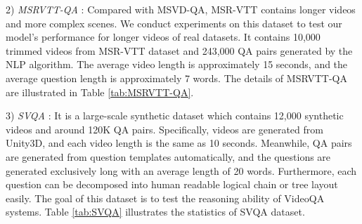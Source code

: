 \documentclass[journal]{IEEEtran}
\begin{document}
2) \textit{MSRVTT-QA} \cite{xu2016msr}: Compared with MSVD-QA, MSR-VTT contains longer videos and more complex scenes. We conduct experiments on this dataset to test our model’s performance for longer videos of real datasets. It contains 10,000 trimmed videos from MSR-VTT dataset \cite{xu2016msr} and 243,000 QA pairs generated by the NLP algorithm. The average video length is approximately 15 seconds, and the average question length is approximately 7 words. The details of MSRVTT-QA are illustrated in Table \ref{tab:MSRVTT-QA}.

3) \textit{SVQA} \cite{song2018explore}:
It is a large-scale synthetic dataset which contains 12,000 synthetic videos and around 120K QA pairs. Specifically, videos are generated from Unity3D, and each video length is the same as 10 seconds. Meanwhile, QA pairs are generated from question templates automatically, and the questions are generated exclusively long with an average length of 20 words. Furthermore, each question can be decomposed into human readable logical chain or tree layout easily. The goal of this dataset is to test the reasoning ability of VideoQA systems. Table \ref{tab:SVQA} illustrates the statistics of SVQA dataset.

\begin{table}[t]
    \centering
    \caption{Statistics of the SVQA Dataset.}
    \label{tab:SVQA}
\end{table}
\end{document}
